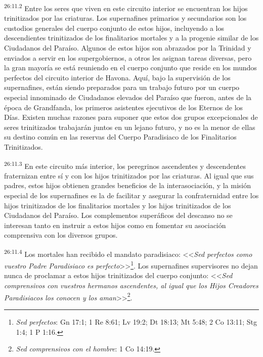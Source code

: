 \par
\textsuperscript{26:11.2} Entre los seres que viven en este circuito interior se encuentran los hijos trinitizados por las criaturas. Los supernafines primarios y secundarios son los custodios generales del cuerpo conjunto de estos hijos, incluyendo a los descendientes trinitizados de los finalitarios mortales y a la progenie similar de los Ciudadanos del Paraíso. Algunos de estos hijos son abrazados por la Trinidad y enviados a servir en los supergobiernos, a otros les asignan tareas diversas, pero la gran mayoría se está reuniendo en el cuerpo conjunto que reside en los mundos perfectos del circuito interior de Havona. Aquí, bajo la supervisión de los supernafines, están siendo preparados para un trabajo futuro por un cuerpo especial innominado de Ciudadanos elevados del Paraíso que fueron, antes de la época de Grandfanda, los primeros asistentes ejecutivos de los Eternos de los Días. Existen muchas razones para suponer que estos dos grupos excepcionales de seres trinitizados trabajarán juntos en un lejano futuro, y no es la menor de ellas su destino común en las reservas del Cuerpo Paradisiaco de los Finalitarios Trinitizados.

\par
\textsuperscript{26:11.3} En este circuito más interior, los peregrinos ascendentes y descendentes fraternizan entre sí y con los hijos trinitizados por las criaturas. Al igual que sus padres, estos hijos obtienen grandes beneficios de la interasociación, y la misión especial de los supernafines es la de facilitar y asegurar la confraternidad entre los hijos trinitizados de los finalitarios mortales y los hijos trinitizados de los Ciudadanos del Paraíso. Los complementos superáficos del descanso no se interesan tanto en instruir a estos hijos como en fomentar su asociación comprensiva con los diversos grupos.

\par
\textsuperscript{26:11.4} Los mortales han recibido el mandato paradisiaco: <<\textit{Sed perfectos como vuestro Padre Paradisiaco es perfecto}>>\footnote{\textit{Sed perfectos}: Gn 17:1; 1 Re 8:61; Lv 19:2; Dt 18:13; Mt 5:48; 2 Co 13:11; Stg 1:4; 1 P 1:16.}. Los supernafines supervisores no dejan nunca de proclamar a estos hijos trinitizados del cuerpo conjunto: <<\textit{Sed comprensivos con vuestros hermanos ascendentes, al igual que los Hijos Creadores Paradisiacos los conocen y los aman}>>\footnote{\textit{Sed comprensivos con el hombre}: 1 Co 14:19.}.

